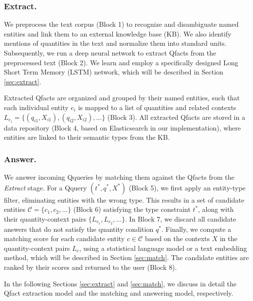 \subsubsection{Extract.}  
We preprocess the text corpus (Block 1) to recognize
and disambiguate named entities 
and link them to an external knowledge base (KB). We also identify mentions of quantities in the text and normalize them into standard units. 
Subsequently, we run a deep neural network to extract Qfacts from the preprocessed text (Block 2). We learn and employ a specifically designed
Long Short Term Memory (LSTM) network, which will be described in Section \ref{sec:extract}. 

Extracted Qfacts are organized and grouped by their named entities, such that each individual entity $e_i$ is mapped to a list of quantities and related contexts $L_{e_i} = \{(q_{i1},X_{i1}),(q_{i2},X_{i2}),... \}$ (Block 3).
All extracted Qfacts are stored in a data repository (Block 4, 
based on Elasticsearch in our implementation), where entities are linked to their semantic types from the KB.



\subsubsection{Answer.}
We answer incoming Qqueries by matching them against
the Qfacts from the \textit{Extract} stage. 
For a Qquery $(t^*,q^*,X^*)$ (Block 5), we first apply 
an entity-type filter, eliminating entities with the wrong type. 
This results in a set of candidate entities $\mathcal{C} = \{c_1,c_2,...\}$ (Block 6) satisfying the type constraint $t^*$, along with their quantity-context pairs $\{L_{c_1},L_{c_2},...\}$. 
In Block 7, we discard all candidate answers 
that do not satisfy the quantity condition $q^*$.
Finally, we compute a matching score for each candidate entity $c \in \mathcal{C}$ based on the contexts $X$ in the
quantity-context pairs $L_c$, using a statistical language model
or a text embedding method, which will be described in Section \ref{sec:match}. The candidate entities are ranked by their scores and returned to the user (Block 8). 

In the following Sections
\ref{sec:extract} and \ref{sec:match}, we discuss in detail the
 Qfact extraction model and the matching and answering model, 
respectively.

